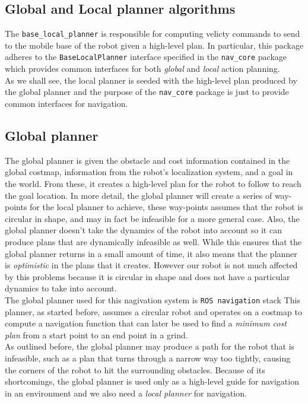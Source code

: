 \subsection{Global and Local planner algorithms}
The \texttt{base\_local\_planner} is responsible for computing velicty commands
to send to the mobile base of the robot given a high-level plan. In particular,
this package adheres to the \texttt{BaseLocalPlanner} interface specified in the 
\texttt{nav\_core} package which provides common interfaces for both \textit{global}
and \textit{local} action planning.
\\
As we shall see, the local planner is seeded with the high-level plan produced by
the global planner and the purpose of the \texttt{nav\_core} package is just to 
provide common interfaces for navigation. 
\subsection*{Global planner}
The global planner is given the obstacle and cost information contained
in the global costmap, information from the robot’s localization system, and
a goal in the world. From these, it creates a high-level plan for the robot
to follow to reach the goal location. In more detail, the global planner will
create a series of way-points for the local planner to achieve, these way-points
assumes that the robot is circular in shape, and may in fact be infeasible for a
more general case. Also, the global planner doesn’t take the dynamics of the
robot into account so it can produce plans that are dynamically infeasible as
well. While this ensures that the global planner returns in a small amount of
time, it also means that the planner is \textit{optimistic} in the plans that it creates.
However our robot is not much affected by this problems because it is circular
in shape and does not have a particular dynamics to take into account.
\\
The global planner used for this nagivation system is \texttt{ROS navigation} stack
This planner, as started before, assumes a circular robot and operates on a costmap 
to compute a navigation function that can later be used to find a \textit{minimum cost plan}
from a start point to an end point in a grind.
\\
As outlined before, the global planner may produce a path for the robot that is infeasible,
such as a plan that turns through a narrow way too tightly, causing the corners of the 
robot to hit the surrounding obstacles. Because of its shortcomings, the global planner 
is used only as a high-level guide for navigation in an environment and we also need a 
\textit{local planner} for navigation.

